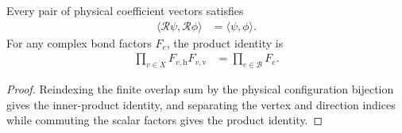 \begin{lemma}%
    \label{lem:peps_torus_physical_bond_regrouping_overlap}
    \leanok
    Every pair of physical coefficient vectors satisfies
    \begin{align}
        \langle\mathcal R\psi,\mathcal R\phi\rangle
         & =\langle\psi,\phi\rangle.
    \end{align}
    For any complex bond factors $F_e$, the product identity is
    \begin{align}
        \prod_{v\in X}F_{v,\mathrm h}F_{v,\mathrm v}
         & =\prod_{e\in\mathcal B}F_e.
    \end{align}
\end{lemma}
\begin{proof}\leanok
    Reindexing the finite overlap sum by the physical configuration bijection
    gives the inner-product identity, and separating the vertex and direction
    indices while commuting the scalar factors gives the product identity.
\end{proof}

